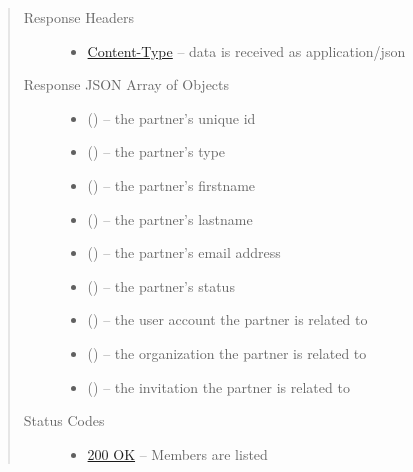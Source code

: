 \documentclass[letterpaper,10pt,english]{sphinxmanual}
\begin{document}
\begin{fulllineitems}
\begin{quote}
\begin{description}
\begin{itemize}
\end{itemize}

\item[{Response Headers}] \leavevmode\begin{itemize}
\item {} 
\href{http://tools.ietf.org/html/rfc7231\#section-3.1.1.5}{Content-Type} -- data is received as application/json

\end{itemize}

\item[{Response JSON Array of Objects}] \leavevmode\begin{itemize}
\item {} 
 () -- the partner's unique id

\item {} 
 () -- the partner's type

\item {} 
 () -- the partner's firstname

\item {} 
 () -- the partner's lastname

\item {} 
 () -- the partner's email address

\item {} 
 () -- the partner's status

\item {} 
 () -- the user account the partner is related to

\item {} 
 () -- the organization the partner is
related to

\item {} 
 () -- the invitation the partner is related to

\end{itemize}

\item[{Status Codes}] \leavevmode\begin{itemize}
\item {} 
\href{http://www.w3.org/Protocols/rfc2616/rfc2616-sec10.html\#sec10.2.1}{200 OK} -- Members are listed


\end{itemize}
\end{description}
\end{quote}
\end{fulllineitems}
\end{document}
